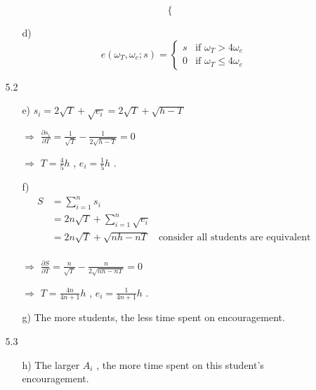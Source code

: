 \documentclass{article}
\begin{document}
\begin{enumerate}
\begin{enumerate}
\begin{enumerate}
\begin{equation}
\begin{cases}
                \end{cases}
                \nonumber
            \end{equation}
            \item[d)] \begin{equation}
                e(\omega_T,\omega_e;s)=\begin{cases}
                    s & \text{if } \omega_T>4\omega_e \\
                    0 & \text{if } \omega_T\leq4\omega_e
                \end{cases}
                \nonumber
            \end{equation}
        \end{enumerate} 
        \item[5.2] \begin{enumerate}
            \item[e)] $s_i=2\sqrt{T}+\sqrt{e_i}=2\sqrt{T}+\sqrt{h-T}$ \par
            $\Rightarrow$ $\frac{\partial s_i}{\partial T}=\frac{1}{\sqrt{T}}-\frac{1}{2\sqrt{h-T}}=0$ \par
            $\Rightarrow$ $T=\frac{4}{5}h$ , $e_i=\frac{1}{5}h$ .
            \item[f)] \begin{equation}
                \begin{aligned}
                    S
                    &=\sum_{i=1}^n s_i \\
                    &=2n\sqrt{T}+\sum_{i=1}^{n}\sqrt{e_i} \\
                    &=2n\sqrt{T}+\sqrt{nh-nT} \quad\text{consider all students are equivalent}\\
                \end{aligned}
                \nonumber
            \end{equation} \par
            $\Rightarrow$ $\frac{\partial S}{\partial T}=\frac{n}{\sqrt{T}}-\frac{n}{2\sqrt{nh-nT}}=0$ \par
            $\Rightarrow$ $T=\frac{4n}{4n+1}h$ , $e_i=\frac{1}{4n+1}h$ .
            \item[g)] The more students, the less time spent on encouragement.
        \end{enumerate}
        \item[5.3] \begin{enumerate}
            \item[h)] The larger $A_i$ , the more time spent on this student's encouragement.

\end{enumerate}
\end{enumerate}
\end{enumerate}
\end{document}

